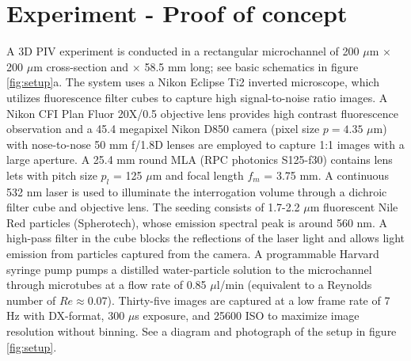 \documentclass[draftthesis,fullpage]{uiucthesis}
\begin{document}
\section*{Experiment - Proof of concept}
A 3D PIV experiment is conducted in a rectangular microchannel of 200 $\mu$m $\times$ 200 $\mu$m cross-section and $\times$ 58.5 mm long; see basic schematics  in figure \ref{fig:setup}a. The system uses a Nikon Eclipse Ti2 inverted microscope, which utilizes fluorescence filter cubes to capture high signal-to-noise ratio images. A Nikon CFI Plan Fluor 20X/0.5 objective lens provides high contrast fluorescence observation and a 45.4 megapixel Nikon D850 camera (pixel size $p=4.35$ $\mu$m) with nose-to-nose 50 mm f/1.8D lenses are employed to capture 1:1 images with a large aperture. A 25.4 mm round MLA (RPC photonics S125-f30) contains lens lets with pitch size $p_l$ = 125 $\mu$m and focal length $f_m$ = 3.75 mm. 
A continuous 532 nm laser is used to illuminate the interrogation volume through a dichroic filter cube and objective lens. The seeding consists of 1.7-2.2 $\mu$m fluorescent Nile Red particles (Spherotech), whose emission spectral peak is around 560 nm. A high-pass filter in the cube blocks the reflections of the laser light and allows light emission from particles captured from the camera. A programmable Harvard syringe pump pumps a distilled water-particle solution to the microchannel through microtubes at a flow rate of  0.85 $\mu$l/min (equivalent to a Reynolds number of $Re\approx 0.07$). Thirty-five images are captured at a low frame rate of 7 Hz with DX-format, 300 $\mu$s exposure, and 25600 ISO to maximize image resolution without binning.  See a diagram and photograph of the setup in figure \ref{fig:setup}.
\end{document}
